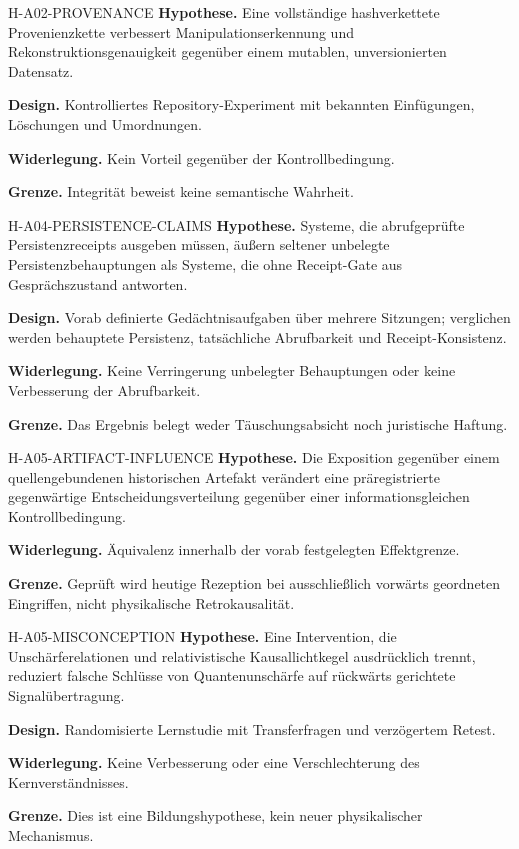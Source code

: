 \documentclass[11pt,a4paper]{article}
\begin{document}
\begin{boundarybox}{H-A02-PROVENANCE}
\textbf{Hypothese.} Eine vollständige hashverkettete Provenienzkette verbessert Manipulationserkennung und Rekonstruktionsgenauigkeit gegenüber einem mutablen, unversionierten Datensatz.\par
\textbf{Design.} Kontrolliertes Repository-Experiment mit bekannten Einfügungen, Löschungen und Umordnungen.\par
\textbf{Widerlegung.} Kein Vorteil gegenüber der Kontrollbedingung.\par
\textbf{Grenze.} Integrität beweist keine semantische Wahrheit.
\end{boundarybox}

\begin{boundarybox}{H-A04-PERSISTENCE-CLAIMS}
\textbf{Hypothese.} Systeme, die abrufgeprüfte Persistenzreceipts ausgeben müssen, äußern seltener unbelegte Persistenzbehauptungen als Systeme, die ohne Receipt-Gate aus Gesprächszustand antworten.\par
\textbf{Design.} Vorab definierte Gedächtnisaufgaben über mehrere Sitzungen; verglichen werden behauptete Persistenz, tatsächliche Abrufbarkeit und Receipt-Konsistenz.\par
\textbf{Widerlegung.} Keine Verringerung unbelegter Behauptungen oder keine Verbesserung der Abrufbarkeit.\par
\textbf{Grenze.} Das Ergebnis belegt weder Täuschungsabsicht noch juristische Haftung.
\end{boundarybox}

\begin{boundarybox}{H-A05-ARTIFACT-INFLUENCE}
\textbf{Hypothese.} Die Exposition gegenüber einem quellengebundenen historischen Artefakt verändert eine präregistrierte gegenwärtige Entscheidungsverteilung gegenüber einer informationsgleichen Kontrollbedingung.\par
\textbf{Widerlegung.} Äquivalenz innerhalb der vorab festgelegten Effektgrenze.\par
\textbf{Grenze.} Geprüft wird heutige Rezeption bei ausschließlich vorwärts geordneten Eingriffen, nicht physikalische Retrokausalität.
\end{boundarybox}

\begin{boundarybox}{H-A05-MISCONCEPTION}
\textbf{Hypothese.} Eine Intervention, die Unschärferelationen und relativistische Kausallichtkegel ausdrücklich trennt, reduziert falsche Schlüsse von Quantenunschärfe auf rückwärts gerichtete Signalübertragung.\par
\textbf{Design.} Randomisierte Lernstudie mit Transferfragen und verzögertem Retest.\par
\textbf{Widerlegung.} Keine Verbesserung oder eine Verschlechterung des Kernverständnisses.\par
\textbf{Grenze.} Dies ist eine Bildungshypothese, kein neuer physikalischer Mechanismus.
\end{boundarybox}
\end{document}
